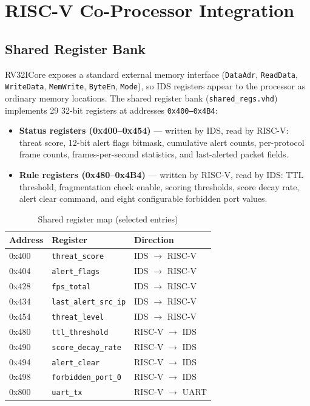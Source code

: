 \section{RISC-V Co-Processor Integration}

\subsection{Shared Register Bank}
RV32ICore exposes a standard external memory interface (\texttt{DataAdr}, \texttt{ReadData}, \texttt{WriteData}, \texttt{MemWrite}, \texttt{ByteEn}, \texttt{Mode}), so IDS registers appear to the processor as ordinary memory locations. The shared register bank (\texttt{shared\_regs.vhd}) implements 29 32-bit registers at addresses \texttt{0x400--0x4B4}:

\begin{itemize}
	\item \textbf{Status registers (0x400--0x454)} — written by IDS, read by RISC-V: threat score, 12-bit alert flags bitmask, cumulative alert counts, per-protocol frame counts, frames-per-second statistics, and last-alerted packet fields.
	\item \textbf{Rule registers (0x480--0x4B4)} — written by RISC-V, read by IDS: TTL threshold, fragmentation check enable, scoring thresholds, score decay rate, alert clear command, and eight configurable forbidden port values.
\end{itemize}

\begin{table}[H]
	\centering
	\caption{Shared register map (selected entries)}
	\begin{tabular}{lll}
		\toprule
		\textbf{Address} & \textbf{Register} & \textbf{Direction} \\
		\midrule
		0x400 & \texttt{threat\_score}          & IDS $\rightarrow$ RISC-V \\
		0x404 & \texttt{alert\_flags}           & IDS $\rightarrow$ RISC-V \\
		0x428 & \texttt{fps\_total}             & IDS $\rightarrow$ RISC-V \\
		0x434 & \texttt{last\_alert\_src\_ip}   & IDS $\rightarrow$ RISC-V \\
		0x454 & \texttt{threat\_level}          & IDS $\rightarrow$ RISC-V \\
		0x480 & \texttt{ttl\_threshold}         & RISC-V $\rightarrow$ IDS \\
		0x490 & \texttt{score\_decay\_rate}     & RISC-V $\rightarrow$ IDS \\
		0x494 & \texttt{alert\_clear}           & RISC-V $\rightarrow$ IDS \\
		0x498 & \texttt{forbidden\_port\_0}     & RISC-V $\rightarrow$ IDS \\
		0x800 & \texttt{uart\_tx}               & RISC-V $\rightarrow$ UART \\
		\bottomrule
	\end{tabular}
	\label{tab:regmap}
\end{table}

